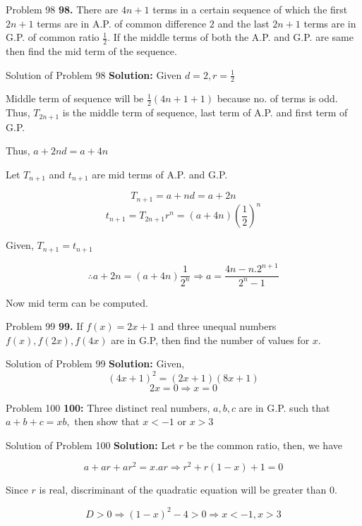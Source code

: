 \documentclass[aspectratio=1610,8pt]{beamer}
\begin{document}
\begin{frame}{Problem 98}
  \textbf{98.} There are $4n + 1$ terms in a certain sequence of which the first $2n + 1$ terms are in A.P. of common difference
  $2$ and the last $2n + 1$ terms are in G.P. of common ratio $\frac{1}{2}.$ If the middle terms of both the A.P. and G.P. are same
  then find the mid term of the sequence.
\end{frame}
\begin{frame}{Solution of Problem 98}
  \textbf{Solution:} Given $d = 2, r = \frac{1}{2}$

  Middle term of sequence will be $\frac{1}{2}(4n + 1 + 1)$ because no. of terms is odd. Thus, $T_{2n + 1}$ is the middle term of
  sequence, last term of A.P. and first term of G.P.

  Thus, $a + 2nd = a + 4n$

  Let $T_{n + 1}$ and $t_{n + 1}$ are mid terms of A.P. and G.P.

  $$T_{n + 1} = a + nd = a + 2n$$
  $$t_{n + 1} = T_{2n + 1}r^n = (a + 4n)\left(\frac{1}{2}\right)^n$$

  Given, $T_{n + 1} = t_{n + 1}$

  $$\therefore a + 2n = (a + 4n)\frac{1}{2^n} \Rightarrow a = \frac{4n - n.2^{n + 1}}{2^n - 1}$$

  Now mid term can be computed.
\end{frame}
\begin{frame}{Problem 99}
  \textbf{99.} If $f(x) = 2x + 1$ and three unequal numbers $f(x), f(2x), f(4x)$ are in G.P, then find the number of values for
  $x.$
\end{frame}
\begin{frame}{Solution of Problem 99}
  \textbf{Solution:} Given, $$(4x + 1)^2 = (2x + 1)(8x + 1)$$
  $$2x = 0 \Rightarrow x = 0$$
\end{frame}
\begin{frame}{Problem 100}
  \textbf{100:} Three distinct real numbers, $a, b, c$ are in G.P. such that $a + b + c = xb,$ then show that $x < -1$ or $x >
  3$
\end{frame}
\begin{frame}{Solution of Problem 100}
  \textbf{Solution:} Let $r$ be the common ratio, then, we have

  $$a + ar + ar^2 = x.ar \Rightarrow r^2 + r(1 - x) + 1 = 0$$

  Since $r$ is real, discriminant of the quadratic equation will be greater than $0.$

  $$D > 0 \Rightarrow (1 - x)^2 - 4> 0 \Rightarrow x < -1, x > 3$$
\end{frame}
\end{document}
